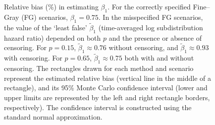 \documentclass[
  letterpaper,
  DIV=11,
  numbers=noendperiod]{scrreprt}
\begin{document}
\begin{figure}


\caption{\label{fig-bias-X}Relative bias (\%) in estimating \(\beta_1\).
For the correctly specified Fine--Gray (FG) scenarios,
\(\beta_1 = 0.75\). In the misspecified FG scenarios, the value of the
`least false' \(\tilde{\beta}_1\) (time-averaged log subdistribution
hazard ratio) depended on both \(p\) and the presence or absence of
censoring. For \(p = 0.15\), \(\tilde{\beta}_1 \approx 0.76\) without
censoring, and \(\tilde{\beta}_1 \approx 0.93\) with censoring. For
\(p = 0.65\), \(\tilde{\beta}_1 \approx 0.75\) both with and without
censoring. The rectangles drawn for each method and scenario represent
the estimated relative bias (vertical line in the middle of a
rectangle), and its 95\% Monte Carlo confidence interval (lower and
upper limits are represented by the left and right rectangle borders,
respectively). The confidence interval is constructed using the standard
normal approximation.}

\end{figure}%
\end{document}
